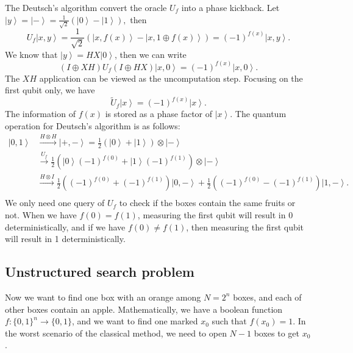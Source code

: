 \documentclass[11pt]{article}
\newcommand{\ket}[1]{\left|#1\right\rangle}
\begin{document}
The Deutsch's algorithm convert the oracle $U_f$ into a phase kickback. Let $\ket{y} = \ket{-} = \frac{1}{\sqrt{2}}(\ket{0} - \ket{1}),$ then
\begin{equation}
    U_f\ket{x,y} = \frac{1}{\sqrt{2}}(\ket{x,f(x)} - \ket{x,1\oplus f(x)}) = (-1)^{f(x)}\ket{x,y}.
\end{equation}
We know that $\ket{y} = HX\ket{0}$, then we can write 
\begin{equation}
    (I\oplus XH)U_f(I\oplus HX)\ket{x,0} = (-1)^{f(x)}\ket{x,0}.
\end{equation}
The $XH$ application can be viewed as the uncomputation step. Focusing on the first qubit only, we have 
\begin{equation}
    \tilde{U}_f\ket{x} = (-1)^{f(x)}\ket{x}.
\end{equation}
The information of $f(x)$ is stored as a phase factor of $\ket{x}$. The quantum operation for Deutsch's algorithm is as follows:
\begin{align}
        \ket{0,1} &\xrightarrow{H\otimes H}{\ket{+,-}} = \frac{1}{2}(\ket{0}+\ket{1})\otimes\ket{-}  \nonumber \\
        &\xrightarrow{U_f}{\frac{1}{2}(\ket{0}(-1)^{f(0)} + \ket{1}(-1)^{f(1)})\otimes\ket{-}} \nonumber\\
        &\xrightarrow{H\otimes I}\frac{1}{2}((-1)^{f(0)} + (-1)^{f(1)})\ket{0,-} + \frac{1}{2}((-1)^{f(0)} - (-1)^{f(1)})\ket{1,-}. \nonumber\\
\end{align}
We only need one query of $U_f$ to check if the boxes contain the same fruits or not. When we have $f(0) = f(1)$, measuring the first qubit will result in 0 deterministically, and if we have $f(0) \neq f(1)$, then measuring the first qubit
will result in 1 deterministically. 

\subsection{Unstructured search problem}
Now we want to find one box with an orange among $N = 2^n$ boxes, and each of other boxes contain an apple. Mathematically, we have a boolean function $f: \{0,1\}^n \rightarrow \{0,1\}$, and we want to find one marked $x_0$ such that $f(x_0) = 1$. In the worst scenario of the classical method, 
we need to open $N-1$ boxes to get $x_0$.



\end{document}
